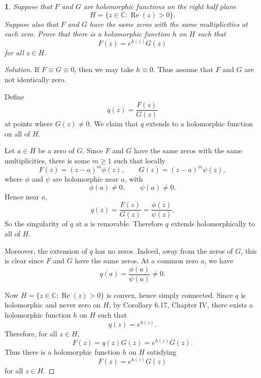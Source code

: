 \documentclass[12pt, a4paper]{report}
\theoremstyle{spaced}
\newtheorem{exercise}{}
\begin{document}
\begin{exercise}
	Suppose that $F$ and $G$ are holomorphic functions on the right half plane
	\[
		H=\{z\in\mathbb{C}:\operatorname{Re}(z)>0\}.
	\]
	Suppose also that $F$ and $G$ have the same zeros with the same multiplicities at each zero. Prove that there is a holomorphic function $h$ on $H$ such that
	\[
		F(z)=e^{h(z)}G(z)
	\]
	for all $z\in H$.
\end{exercise}
\begin{proof}[Solution]
	If \(F\equiv G\equiv 0\), then we may take \(h\equiv 0\). Thus assume that
	\(F\) and \(G\) are not identically zero.

	Define
	\[
		q(z)=\frac{F(z)}{G(z)}
	\]
	at points where \(G(z)\neq 0\). We claim that \(q\) extends to a holomorphic
	function on all of \(H\).

	Let \(a\in H\) be a zero of \(G\). Since \(F\) and \(G\) have the same zeros
	with the same multiplicities, there is some \(m\ge 1\) such that locally
	\[
		F(z)=(z-a)^m\phi(z),
		\qquad
		G(z)=(z-a)^m\psi(z),
	\]
	where \(\phi\) and \(\psi\) are holomorphic near \(a\), with
	\[
		\phi(a)\neq 0,
		\qquad
		\psi(a)\neq 0.
	\]
	Hence near \(a\),
	\[
		q(z)=\frac{F(z)}{G(z)}
		=\frac{\phi(z)}{\psi(z)}.
	\]
	So the singularity of \(q\) at \(a\) is removable. Therefore \(q\) extends
	holomorphically to all of \(H\).

	Moreover, the extension of \(q\) has no zeros. Indeed, away from the zeros of
	\(G\), this is clear since \(F\) and \(G\) have the same zeros. At a common
	zero \(a\), we have
	\[
		q(a)=\frac{\phi(a)}{\psi(a)}\neq 0.
	\]

	Now \(H=\{z\in\mathbb C:\operatorname{Re}(z)>0\}\) is convex, hence simply
	connected. Since \(q\) is holomorphic and never zero on \(H\), by Corollary
	6.17, Chapter IV, there exists a holomorphic function \(h\) on \(H\) such that
	\[
		q(z)=e^{h(z)}.
	\]
	Therefore, for all \(z\in H\),
	\[
		F(z)=q(z)G(z)=e^{h(z)}G(z).
	\]
	Thus there is a holomorphic function \(h\) on \(H\) satisfying
	\[
		F(z)=e^{h(z)}G(z)
	\]
	for all \(z\in H\).
\end{proof}
\end{document}
